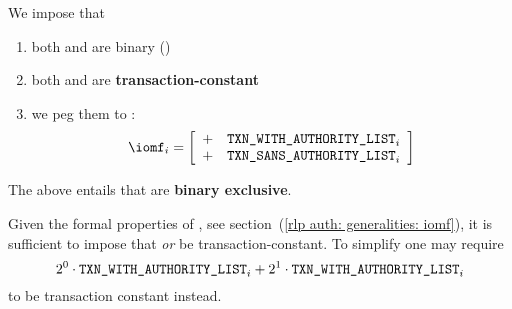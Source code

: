 We impose that
\begin{enumerate}
	\item both \transactionTypeWithAuthorityLists{} and \transactionTypeWithAuthorityLists{} are binary (\sanityCheck)
	\item both \transactionTypeWithAuthorityLists{} and \transactionTypeWithAuthorityLists{} are \textbf{transaction-constant}
	\item we peg them to \iomf{}:
		\[
			\iomf _{i}
			=
			\left[ \begin{array}{cl}
				+ & \transactionTypeWithAuthorityLists _{i} \\
				+ & \transactionTypeSansAuthorityLists _{i} \\
			\end{array} \right]
		\]
\end{enumerate}
\saNote{} \label{rlp auth: generalities: transactions with or sans authority list: exclusivity}
The above entails that
\transactionTypeWithAuthorityLists{}
\transactionTypeSansAuthorityLists{}
are \textbf{binary exclusive}.

\saNote{}
Given the formal properties of \iomf{},
see section~(\ref{rlp auth: generalities: iomf}),
it is sufficient to impose that
\transactionTypeSansAuthorityLists{}
\emph{or}
\transactionTypeWithAuthorityLists{}
be transaction-constant.
To simplify one may require
\[
	2^{0} \cdot \texttt{TXN\_WITH\_AUTHORITY\_LIST} _{i} + 2^{1} \cdot \texttt{TXN\_WITH\_AUTHORITY\_LIST} _{i}
\]
to be transaction constant instead.
